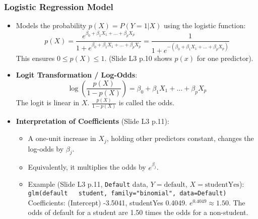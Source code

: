 \documentclass[12pt,a4paper]{article}
\newcommand{\Robject}[1]{\texttt{#1}} %
\newcommand{\Rcode}[1]{\texttt{#1}} %
\begin{document}
\begin{itemize}
    \subsubsection{Logistic Regression Model }
        \begin{itemize}
            \item Models the probability $p(X) = P(Y=1|X)$ using the logistic function:
                $$ p(X) = \frac{e^{\beta_0 + \beta_1 X_1 + \dots + \beta_p X_p}}{1 + e^{\beta_0 + \beta_1 X_1 + \dots + \beta_p X_p}} = \frac{1}{1 + e^{-(\beta_0 + \beta_1 X_1 + \dots + \beta_p X_p)}} $$
                This ensures $0 \le p(X) \le 1$. (Slide L3 p.10 shows $p(x)$ for one predictor).
            \item \textbf{Logit Transformation / Log-Odds}:
                $$ \log\left(\frac{p(X)}{1-p(X)}\right) = \beta_0 + \beta_1 X_1 + \dots + \beta_p X_p $$
                The logit is linear in $X$. $\frac{p(X)}{1-p(X)}$ is called the odds.
            \item \textbf{Interpretation of Coefficients} (Slide L3 p.11):
                \begin{itemize}
                    \item A one-unit increase in $X_j$, holding other predictors constant, changes the log-odds by $\beta_j$.
                    \item Equivalently, it multiplies the odds by $e^{\beta_j}$.
                    \item Example (Slide L3 p.11, \Robject{Default} data, $Y=\text{default}$, $X=\text{studentYes}$):
                        \Rcode{glm(default ~ student, family="binomial", data=Default)}
                        Coefficients: (Intercept) -3.5041, studentYes 0.4049.
                        $e^{0.4049} \approx 1.50$. The odds of default for a student are 1.50 times the odds for a non-student.
                \end{itemize}
        \end{itemize}


\end{itemize}
\end{document}
